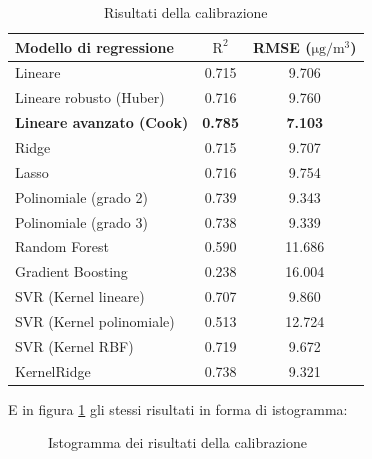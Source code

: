 \begin{table}[H]
    \footnotesize
    \centering
    \begin{tabular}{|l|c|c|}
    \hline
        \textbf{Modello di regressione} & $\bm{\mathrm{R^2}}$ & \textbf{RMSE (}$\mathrm{\si{\micro}g/m^3}$) \\ \hline
        Lineare & 0.715 & 9.706 \\ \hline
        Lineare robusto (Huber) & 0.716 & 9.760 \\ \hline
        \textbf{Lineare avanzato (Cook)} & \textbf{0.785} & \textbf{7.103} \\ \hline
        Ridge & 0.715 & 9.707 \\ \hline
        Lasso & 0.716 & 9.754 \\ \hline
        Polinomiale (grado 2) & 0.739 & 9.343 \\ \hline
        Polinomiale (grado 3) & 0.738 & 9.339 \\ \hline
        Random Forest & 0.590 & 11.686 \\ \hline
        Gradient Boosting & 0.238 & 16.004 \\ \hline
        SVR (Kernel lineare) & 0.707 & 9.860 \\ \hline
        SVR (Kernel polinomiale) & 0.513 & 12.724 \\ \hline
        SVR (Kernel RBF) & 0.719 & 9.672 \\ \hline
        KernelRidge & 0.738 & 9.321 \\ \hline
    \end{tabular}
    \captionsetup{justification=centering}
    \caption{Risultati della calibrazione }
    \label{fig:risultati-pm10}
\end{table}

E in figura \ref{fig:risultati-pm10-hist} gli stessi risultati in forma di istogramma:

\begin{figure}[H]%
    \centering
    \captionsetup{justification=centering}
    \caption{Istogramma dei risultati della calibrazione }%
    \label{fig:risultati-pm10-hist}%
\end{figure}

